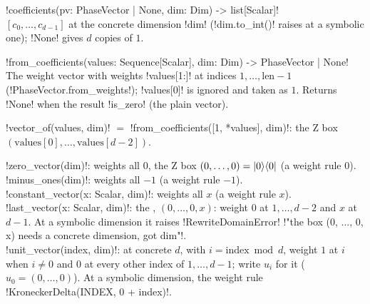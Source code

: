 \begin{signature}
\py!coefficients(pv: PhaseVector | None, dim: Dim) -> list[Scalar]!\\
$[c_0,\dots,c_{d-1}]$ at the concrete dimension \py!dim! (\py!dim.to_int()! raises at a symbolic
one); \py!None! gives $d$ copies of $1$.

\py!from_coefficients(values: Sequence[Scalar], dim: Dim) -> PhaseVector | None!\\
The weight vector with weights \py!values[1:]! at indices $1,\dots,\text{len}-1$
(\py!PhaseVector.from_weights!); \py!values[0]! is ignored and taken as $1$. Returns \py!None!
when the result \py!is_zero! (the plain vector).

\py!vector_of(values, dim)! $=$ \py!from_coefficients([1, *values], dim)!: the Z box
$(\text{values}[0],\dots,\text{values}[d-2])$.
\end{signature}

\begin{signature}
\py!zero_vector(dim)!: weights all $0$, the Z box $(0,\dots,0)=\lvert 0 \rangle\langle 0 \rvert$ (a weight rule $0$).\\
\py!minus_ones(dim)!: weights all $-1$ (a weight rule $-1$).\\
\py!constant_vector(x: Scalar, dim)!: weights all $x$ (a weight rule $x$).\\
\py!last_vector(x: Scalar, dim)!: the , $(0,\dots,0,x)$: weight $0$ at
$1,\dots,d-2$ and $x$ at $d-1$. At a symbolic dimension it raises \py!RewriteDomainError!
\code!"the box (0, ..., 0, x) needs a concrete dimension, got {dim}"!.\\
\py!unit_vector(index, dim)!: at concrete $d$, with $i=\text{index}\bmod d$, weight $1$ at $i$ when
$i\ne 0$ and $0$ at every other index of $1,\dots,d-1$; write $u_i$ for it ($u_0=(0,\dots,0)$). At a symbolic
dimension, the weight rule \py!KroneckerDelta(INDEX, 0 + index)!.
\end{signature}

